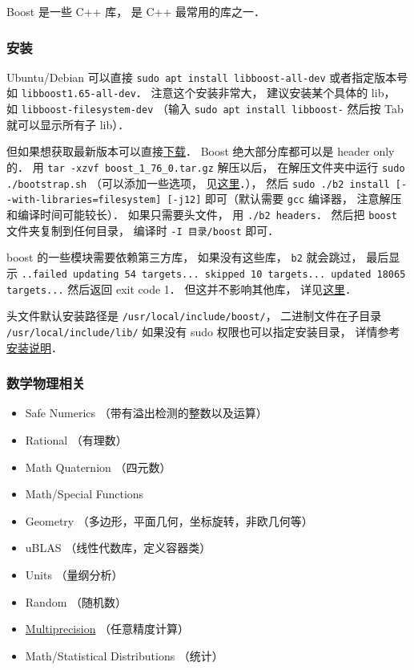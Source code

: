 

Boost 是一些 C++ 库， 是 C++ 最常用的库之一．

\subsubsection{安装}
Ubuntu/Debian 可以直接 \verb|sudo apt install libboost-all-dev| 或者指定版本号如 \verb|libboost1.65-all-dev|． 注意这个安装非常大， 建议安装某个具体的 lib， 如 \verb|libboost-filesystem-dev| （输入 \verb|sudo apt install libboost-| 然后按 Tab 就可以显示所有子 lib）．

但如果想获取最新版本可以直接\href{https://www.boost.org/users/history/version_1_76_0.html}{下载}． Boost 绝大部分库都可以是 header only 的． 用 \verb|tar -xzvf boost_1_76_0.tar.gz| 解压以后， 在解压文件夹中运行 \verb|sudo ./bootstrap.sh| （可以添加一些选项， 见\href{https://www.boost.org/doc/libs/1_66_0/more/getting_started/unix-variants.html#easy-build-and-install}{这里}．）， 然后 \verb|sudo ./b2 install [--with-libraries=filesystem] [-j12]| 即可（默认需要 \verb|gcc| 编译器， 注意解压和编译时间可能较长）． 如果只需要头文件， 用 \verb|./b2 headers|． 然后把 \verb|boost| 文件夹复制到任何目录， 编译时 \verb|-I 目录/boost| 即可．

boost 的一些模块需要依赖第三方库， 如果没有这些库， \verb|b2| 就会跳过， 最后显示 \verb|..failed updating 54 targets... skipped 10 targets... updated 18065 targets...| 然后返回 exit code 1． 但这并不影响其他库， 详见\href{https://stackoverflow.com/questions/12906829/failed-updating-58-targets-when-trying-to-build-boost-what-happened}{这里}．

头文件默认安装路径是 \verb|/usr/local/include/boost/|， 二进制文件在子目录 \verb|/usr/local/include/lib/| 如果没有 sudo 权限也可以指定安装目录， 详情参考\href{https://www.boost.org/doc/libs/1_76_0/more/getting_started/unix-variants.html#easy-build-and-install}{安装说明}．

\subsubsection{数学物理相关}
\begin{itemize}
\item Safe Numerics （带有溢出检测的整数以及运算）
\item Rational （有理数）
\item Math Quaternion （四元数）
\item Math/Special Functions
\item Geometry （多边形，平面几何，坐标旋转，非欧几何等）
\item uBLAS （线性代数库，定义容器类）
\item Units （量纲分析）
\item Random （随机数）
\item \href{https://www.boost.org/doc/libs/1_72_0/libs/multiprecision/doc/html/index.html}{Multiprecision} （任意精度计算）
\item Math/Statistical Distributions （统计）
\end{itemize}

